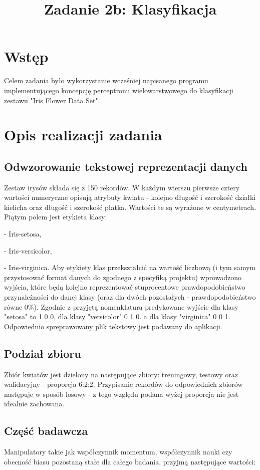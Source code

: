 \documentclass{classrep}
\author{
  \studentinfo{Marcin Pajkowski}{211968} \and
  \studentinfo{Rafał Warda}{214067}
}
\title{Zadanie 2b: Klasyfikacja}
\begin{document}
\maketitle
\newpage
\section{Wstęp}
Celem zadania było wykorzystanie wcześniej napisanego programu implementującego koncepcję perceptronu wielowarstwowego do klasyfikacji zestawu "Iris Flower Data Set".

\section{Opis realizacji zadania}
\subsection{Odwzorowanie tekstowej reprezentacji danych}
Zestaw irysów składa się z 150 rekordów. W każdym wierszu pierwsze cztery wartości numeryczne opisują atrybuty kwiatu - kolejno długość i szerokość działki kielicha oraz długość i szerokość płatka. Wartości te są wyrażone w centymetrach. Piątym polem jest etykieta klasy:

- Iris-setosa,

- Iris-versicolor,

- Iris-virginica.
\newline
Aby etykiety klas przekształcić na wartość liczbową (i tym samym przystosować format danych do zgodnego z specyfiką projektu) wprowadzono wyjścia, które będą kolejno reprezentować stuprocentowe prawdopodobieństwo przynależności do danej klasy (oraz dla dwóch pozostałych - prawdopodobieństwo równe 0\%). Zgodnie z przyjętą nomenklaturą predykowane wyjście dla klasy "setosa" to 1 0 0, dla klasy "versicolor" 0 1 0. a dla klasy "virginica" 0 0 1. Odpowiednio spreprawowany plik tekstowy jest podawany do aplikacji.
\subsection{Podział zbioru}
Zbiór kwiatów jest dzielony na następujące zbiory: treningowy, testowy oraz walidacyjny - proporcja 6:2:2.
Przypisanie rekordów do odpowiednich zbiorów następuje w sposób losowy - z tego względu podana wyżej proporcja nie jest idealnie zachowana.
\subsection{Część badawcza}
Manipulatory takie jak współczynnik momentum, współczynnik nauki czy obecność biasu pozostaną stałe dla całego badania, przyjmą następujące wartości:
\end{document}
